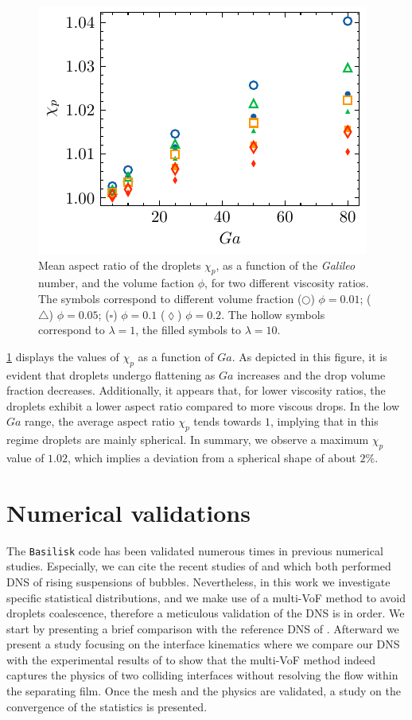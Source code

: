 \documentclass[11pt]{My_preprint}
\providecommand{\DIFadd}[1]{{\protect\color{blue}\uwave{#1}}} %
\providecommand{\DIFdel}[1]{{\protect\color{red}\sout{#1}}}                      %
\providecommand{\DIFaddbegin}{} %
\providecommand{\DIFaddend}{} %
\providecommand{\DIFdelbegin}{} %
\providecommand{\DIFdelend}{} %
\providecommand{\DIFaddbeginFL}{} %
\providecommand{\DIFaddendFL}{} %
\providecommand{\DIFdelbeginFL}{} %
\providecommand{\DIFdelendFL}{} %
\begin{document}
\begin{figure}[h!]
    \centering
    \DIFdelbeginFL %
\DIFdelendFL \DIFaddbeginFL \includegraphics[height = 0.3\textwidth]{image/HOMOGENEOUS_final/PA/chi.pdf}
    \DIFaddendFL \caption{Mean aspect ratio of the droplets $\chi_p$, as a function of the \textit{Galileo} number, and the volume faction $\phi$,  for two different viscosity ratios.  
    The symbols correspond to different volume fraction ($\pmb\bigcirc$) $\phi = 0.01$; ($\pmb\triangle$) $ \phi = 0.05$; ($\pmb\square$) $\phi = 0.1$ ($\pmb\lozenge$) $\phi = 0.2$.
    The hollow symbols correspond to $\lambda = 1$, the filled symbols to $\lambda = 10$.
    }
    \label{fig:chi}
\end{figure}
\ref{fig:chi} displays the values of $\chi_p$ as a function of $Ga$.
As depicted in this figure, it is evident that droplets undergo flattening as $Ga$ increases and the drop volume fraction decreases. 
Additionally, it appears that, for lower viscosity ratios, the droplets exhibit a lower aspect ratio compared to more viscous drops.
In the low $Ga$ range, the average aspect ratio $\chi_p$ tends towards $1$, implying that in this regime droplets are mainly spherical. 
In summary, we observe a maximum $\chi_p$ value of \DIFdelbegin \DIFdel{$1.02$}\DIFdelend \DIFaddbegin \DIFadd{$1.04$}\DIFaddend , which implies a deviation from a spherical shape of about \DIFdelbegin \DIFdel{$2\%$}\DIFdelend \DIFaddbegin \DIFadd{$4\%$}\DIFaddend .






 \section{Numerical validations}
\label{ap:validation}
The \texttt{Basilisk} code has been validated numerous times in previous numerical studies. 
Especially, we can cite the recent studies of \citet{innocenti2020direct} and \citet{hidman2023assessing} which both performed DNS of rising suspensions of bubbles. 
Nevertheless, in this work we investigate specific statistical distributions,
and we make use of a multi-VoF method to avoid droplets coalescence, therefore a meticulous validation of the DNS is in order. 
We start by presenting a brief comparison with the reference DNS of \citet{esmaeeli1999direct}. 
Afterward we present a study focusing on the interface kinematics where we compare our DNS with the experimental results of \citet{mohamed2003drop} to show that the multi-VoF method indeed captures the physics of two colliding interfaces without resolving the flow within the separating film. 
Once the mesh and the physics are validated, a study on the convergence of the statistics is presented. 
\end{document}
